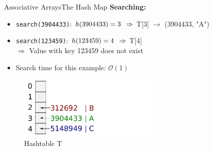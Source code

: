 
\begin{frame}{Associative Arrays}{The Hash Map}
  \textbf{Searching:}
  \small
  \begin{itemize}
     \setlength\itemsep{0.75em}
    \item<1->
      \texttt{search(3904433)}:
      $h(3904433) = 3 \hspace*{0.5em} \Rightarrow$
      T[3] $\rightarrow$ {\color{inkscapeGreen}(3904433, "A")}
    \item<2->
      \texttt{search(123459)}:
      $h(123459) = 4 \hspace*{0.5em} \Rightarrow$
      T[4] {}\\
      \vspace{0.75em}
      $\Rightarrow$ {\color{red}Value with key 123459 does not exist}
    \item<3->
      Search time for this example: {\color{MainA}$\mathcal{O}(1)$}
  \end{itemize}
  \vspace*{-1.0em}
  \begin{figure}
    \caption{Hashtable T}
    \centering
    \includegraphics[width=0.6\textwidth]{Images/Bucket4.pdf}
  \end{figure}
\end{frame}


